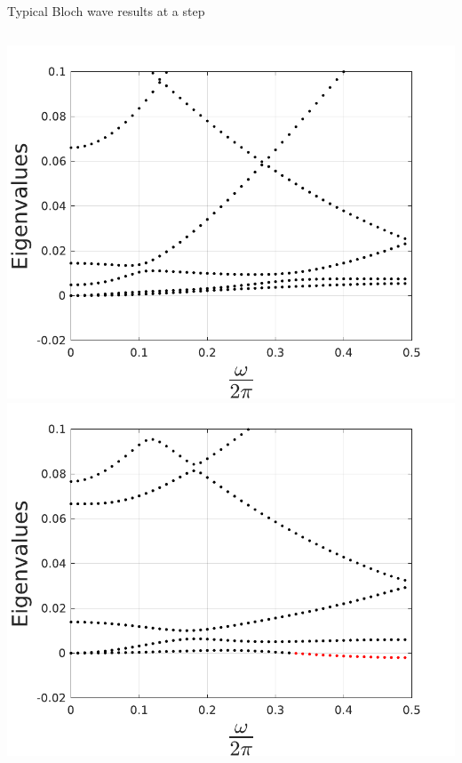 \documentclass{beamer}
\begin{document}
\begin{frame}
	
		\footnotesize Typical Bloch wave results at a step
	\begin{columns}
		 \tiny {}
			\includegraphics[width =\textwidth]{myFigures/blochWave_stable}
		 \tiny {} 
			\includegraphics[width =\textwidth]{myFigures/blochWave_unstable}

	\end{columns}
	\normalsize
\end{frame}	
\end{document}
